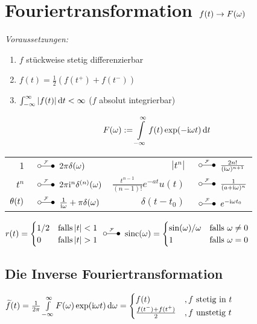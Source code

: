 \documentclass[german,color,5pt]{latex4ei/latex4ei_fs}
\begin{document}
\section{Fouriertransformation \quad $f(t) \rightarrow F(\omega)$}
\begin{sectionbox}
	\emph{Voraussetzungen:}
	\begin{enumerate}
		\item $f$ stückweise stetig differenzierbar
		\item $f(t) = \frac{1}{2}\left(f(t^+) + f(t^-)\right)$
		\item $\int_{-\infty}^{\infty}\abs{f(t)} \diff t < \infty$ ($f$ absolut integrierbar)
	\end{enumerate}
	\begin{emphbox}\vspace{-5pt}
		\[F(\omega) := \int\limits_{-\infty}^\infty f(t) \exp(-\i \omega t) \diff t\]
	\end{emphbox}
	\begin{tabular}{rl|rl}
		$1$ & \!\!\!\!\!\!\!\!\!\! $\FT 2\pi \delta(\omega)$ & $|t^n|$ & \!\!\!\!\!\!\!\!\!\! $\FT \frac{2n!}{(\i \omega)^{n+1}}$\\
		$t^n$ & \!\!\!\!\!\!\!\!\!\! $\FT 2\pi \i^n \delta^{(n)}(\omega)$ & $\frac{t^{n-1}}{(n-1)!} e^{-at} u(t)$ & \!\!\!\!\!\!\!\!\!\! $\FT \frac{1}{(a+\i \omega)^n}$\\
		$\operatorname{\theta}(t)$ & \!\!\!\!\!\!\!\!\!\! $\FT \frac{1}{\i \omega} + \pi \delta(\omega)$ & $\delta(t-t_0)$ & \!\!\!\!\!\!\!\!\!\! $\FT e^{-\i \omega t_0}$\\
	\end{tabular}
	$r(t) = \begin{cases}
	1/2 & \text{falls} \abs{t}<1 \\
	0 & \text{falls} \abs{t}>1
	\end{cases}\FT \sinc(\omega) =  \begin{cases}
	\sin(\omega)/\omega & \text{falls } \omega\ne 0 \\
	1 & \text{falls } \omega= 0
	\end{cases}$
	\subsection{Die Inverse Fouriertransformation}
	$\widetilde{f}(t) = \frac{1}{2\pi} \int\limits_{-\infty}^\infty F(\omega) \exp(\i \omega t) \diff \omega = \begin{cases} f(t) &, f \text{ stetig in }t \\ \frac{f(t^-) + f(t^+)}{2} &, f\text{ unstetig }t \end{cases}$
\end{sectionbox}
\end{document}
